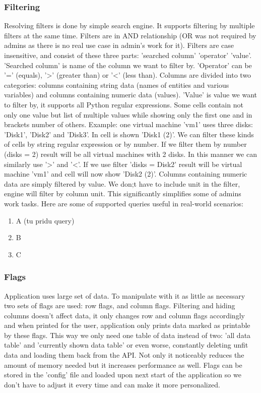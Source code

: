 \subsubsection{Filtering}
Resolving filters is done by simple search engine. It supports filtering by multiple filters at the same time. Filters are in AND relationship (OR was not required by admins as there is no real use case in admin's work for it). Filters are case insensitive, and consist of these three parts: 'searched column' 'operator' 'value'. 'Searched column' is name of the column we want to filter by. 'Operator' can be '=' (equals), '>' (greater than) or '<' (less than). Columns are divided into two categories: columns containing string data (names of entities and various variables) and columns containing numeric data (values). 'Value' is value we want to filter by, it supports all Python regular expressions. Some cells contain not only one value but list of multiple values while showing only the first one and in brackets number of others. Example: one virtual machine 'vm1' uses three disks: 'Disk1', 'Disk2' and 'Disk3'. In cell is shown 'Disk1 (2)'. We can filter these kinds of cells by string regular expression or by number. If we filter them by number (disks = 2) result will be all virtual machines with 2 disks. In this manner we can similarly use '>' and '<'.  If we use filter 'disks = Disk2' result will be virtual machine 'vm1' and cell will now show 'Disk2 (2)'. Columns containing numeric data are simply filtered by value. We don;t have to include unit in the filter, engine will filter by column unit. This significantly simplifies some of admins work tasks. Here are some of supported queries useful in real-world scenarios:
\begin{enumerate}
\item A (tu pridu query)
\item B
\item C
\end{enumerate}

\subsubsection{Flags}
Application uses large set of data. To manipulate with it as little as necessary two sets of flags are used: row flags, and column flags. Filtering and hiding columns doesn't affect data, it only changes row and column flags accordingly and when printed for the user, application only prints data marked as printable by these flags. This way we only need one table of data instead of two: 'all data table' and 'currently shown data table' or even worse, constantly deleting unfit data and loading them back from the API. Not only it noticeably reduces the amount of memory needed but it increases performance as well. Flags can be stored in the 'config' file and loaded upon next start of the application so we don't have to adjust it every time and can make it more personalized.


